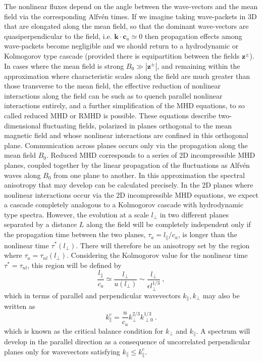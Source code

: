 \documentclass[12pt,a4paper]{article}
\renewcommand{\vec}[1]{\boldsymbol{#1}}
\begin{document}
The nonlinear fluxes depend on the angle between the wave-vectors and the mean field via the corresponding Alfv\'en times. If we imagine taking wave-packets in 3D that are elongated along the mean field, so that the dominant wave-vectors are quasiperpendicular to the field, i.e. $\vec{k}\cdot \vec{c}_a \simeq 0$ then propagation effects among wave-packets become negligible and we should return to a hydrodynamic or Kolmogorov type cascade (provided there is equipartition between the fields $\vec{z}^\pm$). In cases where the mean field is strong $B_0 \gg |\vec{z}^\pm|$, and remaining within the approximation where characteristic scales along the field are much greater than those transverse to the mean field, the effective reduction of nonlinear interactions along the field can be such as to quench parallel nonlinear interactions entirely, and a further simplification of the MHD equations, to so called reduced MHD or RMHD is possible. These equations describe two-dimensional fluctuating fields, polarized in planes orthogonal to the mean magnetic field and whose nonlinear interactions are confined in this orthogonal plane. Communication across planes occurs only via the propagation along the mean field $B_0$. Reduced MHD corresponds to a series of 2D incompressible MHD planes, coupled together by the linear propagation of the fluctuations as Alfv\'en waves along $B_0$ from one plane to another. In this approximation the spectral anisotropy that may develop can be calculated precisely. In the 2D planes where nonlinear interactions occur via the 2D incompressible MHD equations, we expect a cascade completely analogous to a Kolmogorov cascade with hydrodynamic type spectra. However, the evolution at a scale $l_\perp$ in two different planes separated by a distance $L$ along the field will be completely independent only if the propagation time between the two planes, $\tau_a = l_\parallel/c_a$, is longer than the nonlinear time $\tau^\ast(l_\perp)$. There will therefore be an anisotropy set by the region where $\tau_a = \tau_{nl}(l_\perp)$. Considering the Kolmogorov value for the nonlinear time $\tau^\ast = \tau_{nl}$, this region will be defined by
\begin{equation}
\dfrac{l_\parallel}{c_a} \simeq \dfrac{l_\perp}{u(l_\perp)} \sim \dfrac{l_\perp}{\epsilon l_\perp^{1/3}} ~,
\end{equation}
which in terms of parallel and perpendicular wavevectors $k_\parallel, k_\perp$ may also be written as
\begin{equation}
k_\parallel^c = \dfrac{u}{c_a} k_\perp^{2/3} k_{\perp 0}^{1/3} ~.
\end{equation}
which is known as the critical balance condition for $k_\perp$ and $k_\parallel$. A spectrum will develop in the parallel direction as a consequence of uncorrelated perpendicular planes only for wavevectors satisfying $k_\parallel \leqslant k_\parallel^c$.
\end{document}
